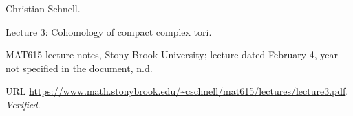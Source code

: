 Christian Schnell.

\newblock Lecture 3: Cohomology of compact complex tori.

\newblock MAT615 lecture notes, Stony Brook University;\allowbreak{} lecture dated February
  4, year not specified in the document, n.d.

\newblock URL
  \url{https://www.math.stonybrook.edu/~cschnell/mat615/lectures/lecture3.pdf}.
\newblock \emph{Verified}.

